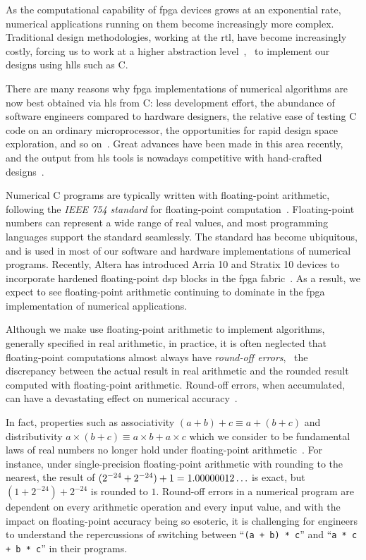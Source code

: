 As the computational capability of \gls{fpga} devices grows at an exponential
rate, numerical applications running on them become increasingly more
complex.  Traditional design methodologies, working at the \gls{rtl}, have
become increasingly costly, forcing us to work at a higher abstraction
level~\cite{gajski, bdti_xilinx, meeus12}, \eg~to implement our designs using
\glspl{hll} such as C\@.

There are many reasons why \gls{fpga} implementations of numerical algorithms
are now best obtained via \gls{hls} from C\@: less development effort, the
abundance of software engineers compared to hardware designers, the relative
ease of testing C code on an ordinary microprocessor, the opportunities
for rapid design space exploration, and so on~\cite{gajski94, meeus12,
nane15}. Great advances have been made in this area recently, and the
output from \gls{hls} tools is nowadays competitive with hand-crafted
designs~\cite{bdti_xilinx}.

Numerical C programs are typically written with floating-point
arithmetic, following the \emph{IEEE 754 standard} for floating-point
computation~\cite{ieee754}.  Floating-point numbers can represent a wide
range of real values, and most programming languages support the standard
seamlessly.  The standard has become ubiquitous, and is used in most of our
software and hardware implementations of numerical programs.  Recently,
Altera has introduced Arria 10 and Stratix 10 devices to incorporate hardened
floating-point \gls{dsp} blocks in the \gls{fpga} fabric~\cite{stratix10fp}.
As a result, we expect to see floating-point arithmetic continuing to dominate
in the \gls{fpga} implementation of numerical applications.

Although we make use floating-point arithmetic to implement algorithms,
generally specified in real arithmetic, in practice, it is often neglected that
floating-point computations almost always have \emph{round-off errors}, \ie~the
discrepancy between the actual result in real arithmetic and the rounded result
computed with floating-point arithmetic.  Round-off errors, when accumulated,
can have a devastating effect on numerical accuracy~\cite{higham02}.

In fact, properties such as associativity $(a + b) + c \equiv a + (b +
c)$ and distributivity $a \times (b + c) \equiv a \times b + a \times c$
which we consider to be fundamental laws of real numbers no longer hold
under floating-point arithmetic~\cite{goldberg}.  For instance, under
single-precision floating-point arithmetic with rounding to the nearest, the
result of $(2^{-24} + 2^{-24}) + 1 = 1.00000012\mathellipsis$ is exact, but
$(1 + 2^{-24}) + 2^{-24}$ is rounded to $1$.  Round-off errors in a numerical
program are dependent on every arithmetic operation and every input value, and
with the impact on floating-point accuracy being so esoteric, it is challenging
for engineers to understand the repercussions of switching between
``\verb|(a + b) * c|'' and ``\verb|a * c + b * c|'' in their programs.

